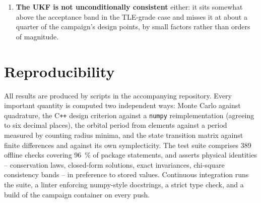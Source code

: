 \documentclass[11pt]{article}
\begin{document}
\begin{enumerate}
        Truth and filter use identical force models and the process noise is
        zero, which isolates the effect of the filters' own approximations.
        Real orbit determination also contends with unmodelled drag and
        solar radiation pressure, which this comparison does not exercise.
  \item \textbf{The UKF is not unconditionally consistent} either: it sits
        somewhat above the acceptance band in the TLE-grade case and misses
        it at about a quarter of the campaign's design points, by small
        factors rather than orders of magnitude.
\end{enumerate}

\section{Reproducibility}

All results are produced by scripts in the accompanying repository. Every
important quantity is computed two independent ways: Monte Carlo against
quadrature, the C\texttt{++} design criterion against a \texttt{numpy}
reimplementation (agreeing to six decimal places), the orbital period from
elements against a period measured by counting radius minima, and the state
transition matrix against finite differences and against its own
symplecticity. The test suite comprises 389 offline checks covering
\SI{96}{\percent} of package statements, and asserts physical identities --
conservation laws, closed-form solutions, exact invariances, chi-square
consistency bands -- in preference to stored values. Continuous integration
runs the suite, a linter enforcing numpy-style docstrings, a strict type
check, and a build of the campaign container on every push.
\end{document}
